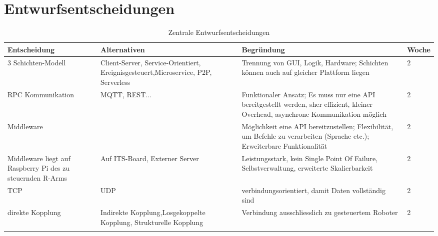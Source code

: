 \chapter{Entwurfsentscheidungen}



\begin{table}[h!]
	\centering
	\begin{tabular}{p{3cm}|p{4cm}| p{5.5cm} | p{1.5cm}|}
		\hline
		\textbf{Entscheidung} & \textbf{Alternativen} & \textbf{Begründung} & \textbf{Woche}\\
		\hline
		3 Schichten-Modell  & Client-Server, Service-Orientiert, Ereignisgesteuert,Microservice, P2P, Serverless  & Trennung von GUI, Logik, Hardware; Schichten können auch auf gleicher Plattform liegen &  2\\
		\hline
		RPC Kommunikation & MQTT, REST... & Funktionaler Ansatz; Es muss nur eine API bereitgestellt werden, sher effizient, kleiner Overhead, asynchrone Kommunikation möglich & 2 \\
		\hline
		Middleware &  & Möglichkeit eine API bereitzustellen; Flexibilität, um Befehle zu verarbeiten (Sprache etc.); Erweiterbare Funktionalität & 2 \\
		\hline
		Middleware liegt auf Raspberry Pi des zu steuernden R-Arms& Auf ITS-Board, Externer Server & Leistungsstark, kein Single Point Of Failure, Selbstverwaltung, erweiterte Skalierbarkeit & 2 \\
		\hline
		TCP & UDP  & verbindungsorientiert, damit Daten vollständig sind& 2\\
		\hline
		direkte Kopplung & Indirekte Kopplung,Losgekoppelte Kopplung, Strukturelle Kopplung  & Verbindung ausschliesslich zu gesteuertem Roboter & 2 \\
		\hline
		&  & & \\
		\hline
	\end{tabular}
	\caption{Zentrale Entwurfsentscheidungen}
	\label{tab:entwurfsentschiedungen}
\end{table}
